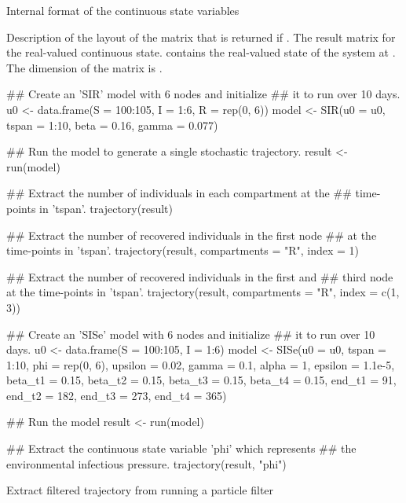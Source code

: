 \documentclass[letterpaper]{book}
\begin{document}
%
\begin{Section}{Internal format of the continuous state variables}

Description of the layout of the matrix that is returned if
. The result matrix for the
real-valued continuous state.  contains the
real-valued state of the system at . The
dimension of the matrix is 
\eqn{\times}{} .
\end{Section}
%
\begin{Examples}
\begin{ExampleCode}
## Create an 'SIR' model with 6 nodes and initialize
## it to run over 10 days.
u0 <- data.frame(S = 100:105, I = 1:6, R = rep(0, 6))
model <- SIR(u0 = u0, tspan = 1:10, beta = 0.16, gamma = 0.077)

## Run the model to generate a single stochastic trajectory.
result <- run(model)

## Extract the number of individuals in each compartment at the
## time-points in 'tspan'.
trajectory(result)

## Extract the number of recovered individuals in the first node
## at the time-points in 'tspan'.
trajectory(result, compartments = "R", index = 1)

## Extract the number of recovered individuals in the first and
## third node at the time-points in 'tspan'.
trajectory(result, compartments = "R", index = c(1, 3))

## Create an 'SISe' model with 6 nodes and initialize
## it to run over 10 days.
u0 <- data.frame(S = 100:105, I = 1:6)
model <- SISe(u0 = u0, tspan = 1:10, phi = rep(0, 6),
    upsilon = 0.02, gamma = 0.1, alpha = 1, epsilon = 1.1e-5,
    beta_t1 = 0.15, beta_t2 = 0.15, beta_t3 = 0.15, beta_t4 = 0.15,
    end_t1 = 91, end_t2 = 182, end_t3 = 273, end_t4 = 365)

## Run the model
result <- run(model)

## Extract the continuous state variable 'phi' which represents
## the environmental infectious pressure.
trajectory(result, "phi")
\end{ExampleCode}
\end{Examples}
%
\begin{Description}
Extract filtered trajectory from running a particle filter
\end{Description}
\end{document}
